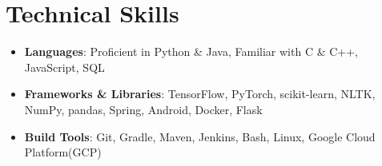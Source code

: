\documentclass[letterpaper,10pt]{article}
\newcommand{\resumeSubHeadingListStart}{\begin{itemize}[leftmargin=\hoffset]}
\newcommand{\resumeSubHeadingListEnd}{\end{itemize}}
\begin{document}
	\section{\faBolt \space Technical Skills}
	\resumeSubHeadingListStart
	\item{
		\textbf{Languages}{: Proficient in Python \& Java, Familiar with C \& C++, JavaScript, SQL}}
	\vspace{-4pt}
	\item{
		\textbf{Frameworks \& Libraries}{: TensorFlow, PyTorch, scikit-learn, NLTK, NumPy, pandas, Spring, Android, Docker, Flask}}
	\vspace{-4pt}
	\item{
		\textbf{Build Tools}{: Git, Gradle, Maven, Jenkins, Bash, Linux, Google Cloud Platform(GCP)}}
	\resumeSubHeadingListEnd
	
	
	
\end{document}
